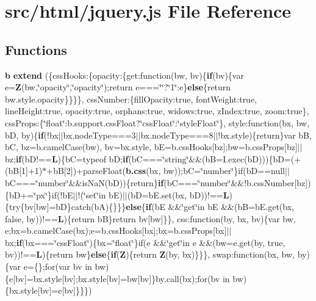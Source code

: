\section{src/html/jquery.js File Reference}
\label{html_2jquery_8js}
\subsection*{Functions}
\begin{DoxyCompactItemize}
\item 
{\bf b} {\bf extend} (\{css\-Hooks\-:\{opacity\-:\{get\-:function(bw, bv)\{{\bf if}(bv)\{var e={\bf Z}(bw,\char`\"{}opacity\char`\"{},\char`\"{}opacity\char`\"{});return e===\char`\"{}\char`\"{}?\char`\"{}1\char`\"{}\-:e\}{\bf else}\{return bw.\-style.\-opacity\}\}\}\}, css\-Number\-:\{fill\-Opacity\-:true, font\-Weight\-:true, line\-Height\-:true, opacity\-:true, orphans\-:true, widows\-:true, z\-Index\-:true, zoom\-:true\}, css\-Props\-:\{\char`\"{}float\char`\"{}\-:b.\-support.\-css\-Float?\char`\"{}css\-Float\char`\"{}\-:\char`\"{}style\-Float\char`\"{}\}, style\-:function(bx, bw, b\-D, by)\{{\bf if}(!bx$\vert$$\vert$bx.\-node\-Type===3$\vert$$\vert$bx.\-node\-Type===8$\vert$$\vert$!bx.\-style)\{return\}var b\-B, b\-C, bz=b.\-camel\-Case(bw), bv=bx.\-style, b\-E=b.\-css\-Hooks[bz];bw=b.\-css\-Props[bz]$\vert$$\vert$bz;{\bf if}(b\-D!=={\bf L})\{b\-C=typeof b\-D;{\bf if}(b\-C===\char`\"{}string\char`\"{}\&\&(b\-B=I.\-exec(b\-D)))\{b\-D=(+(b\-B[1]+1)$\ast$+b\-B[2])+parse\-Float({\bf b.\-css}(bx, bw));b\-C=\char`\"{}number\char`\"{}\}if(b\-D==null$\vert$$\vert$b\-C===\char`\"{}number\char`\"{}\&\&is\-Na\-N(b\-D))\{return\}{\bf if}(b\-C===\char`\"{}number\char`\"{}\&\&!b.\-css\-Number[bz])\{b\-D+=\char`\"{}px\char`\"{}\}if(!b\-E$\vert$$\vert$!(\char`\"{}set\char`\"{}in b\-E)$\vert$$\vert$(b\-D=b\-E.\-set(bx, b\-D))!=={\bf L})\{try\{bv[bw]=b\-D\}catch(b\-A)\{\}\}\}{\bf else}\{{\bf if}(b\-E \&\&\char`\"{}get\char`\"{}in b\-E \&\&(b\-B=b\-E.\-get(bx, false, by))!=={\bf L})\{return b\-B\}return bv[bw]\}\}, css\-:function(by, bx, bv)\{var bw, e;bx=b.\-camel\-Case(bx);e=b.\-css\-Hooks[bx];bx=b.\-css\-Props[bx]$\vert$$\vert$bx;{\bf if}(bx===\char`\"{}css\-Float\char`\"{})\{bx=\char`\"{}float\char`\"{}\}if(e \&\&\char`\"{}get\char`\"{}in e \&\&(bw=e.\-get(by, true, bv))!=={\bf L})\{return bw\}{\bf else}\{{\bf if}({\bf Z})\{return {\bf Z}(by, bx)\}\}\}, swap\-:function(bx, bw, by)\{var e=\{\};for(var bv in bw)\{e[bv]=bx.\-style[bv];bx.\-style[bv]=bw[bv]\}by.\-call(bx);for(bv in bw)\{bx.\-style[bv]=e[bv]\}\}\})

\end{DoxyCompactItemize}
